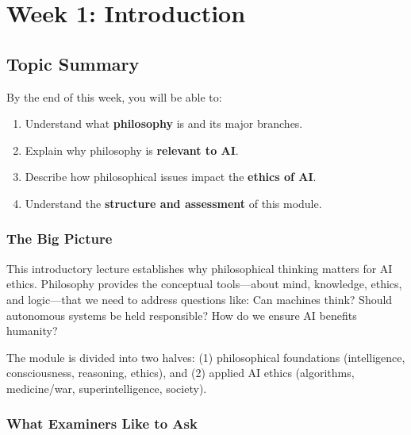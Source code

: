 \section{Week 1: Introduction}

\subsection{Topic Summary}

\begin{keybox}
By the end of this week, you will be able to:
\begin{enumerate}
  \item Understand what \textbf{philosophy} is and its major branches.
  \item Explain why philosophy is \textbf{relevant to AI}.
  \item Describe how philosophical issues impact the \textbf{ethics of AI}.
  \item Understand the \textbf{structure and assessment} of this module.
\end{enumerate}
\end{keybox}

\separator

\subsubsection*{The Big Picture}

This introductory lecture establishes why philosophical thinking matters for AI ethics. Philosophy provides the conceptual tools---about mind, knowledge, ethics, and logic---that we need to address questions like: Can machines think? Should autonomous systems be held responsible? How do we ensure AI benefits humanity?

The module is divided into two halves: (1) philosophical foundations (intelligence, consciousness, reasoning, ethics), and (2) applied AI ethics (algorithms, medicine/war, superintelligence, society).

\separator

\subsubsection*{What Examiners Like to Ask}

